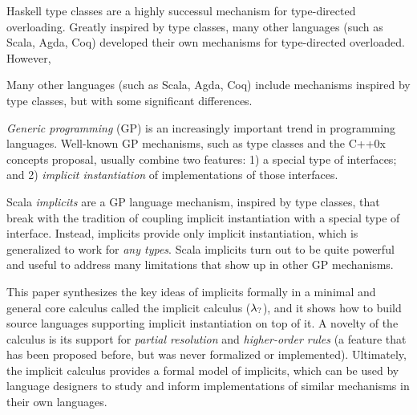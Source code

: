 Haskell type classes are a highly successul mechanism for
type-directed overloading. Greatly inspired by type classes, 
many other languages (such as Scala, Agda,
Coq) developed their own mechanisms 
for type-directed overloaded. However, 

Many other languages (such as Scala, Agda,
Coq) include mechanisms inspired by type classes, but
with some significant differences.

\emph{Generic programming} (GP) is an increasingly important trend in
programming languages. Well-known GP mechanisms, such as type classes
and the C++0x concepts proposal, usually combine two features: 1) a special type of
interfaces; and 2) \emph{implicit instantiation} of implementations of
those interfaces.

Scala \emph{implicits} are a GP language mechanism, inspired by type
classes, that break with the tradition of coupling
implicit instantiation with a special type of interface. Instead,
implicits provide only implicit instantiation, which is generalized to
work for \emph{any types}. 
Scala implicits turn out to be quite
powerful and useful to address many limitations that show up in other
GP mechanisms.

This paper synthesizes the key ideas of implicits formally in a minimal
and general core calculus called the implicit calculus ($\lambda_{?}$),
and it shows how to build source languages supporting implicit
instantiation on top of it. A novelty of the calculus is its support
for \emph{partial resolution} and \emph{higher-order rules} (a feature 
that has been proposed before, but was never formalized or implemented).
Ultimately, the implicit calculus provides a formal model of implicits, 
which can be used by language designers to 
study and inform implementations of similar mechanisms in their own languages.





